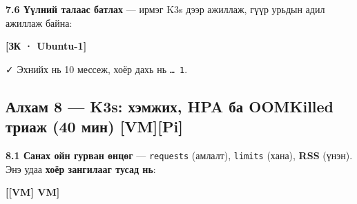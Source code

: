 \textbf{7.6 Үүлний талаас батлах} --- ирмэг K3s дээр ажиллаж, гүүр урьдын адил ажиллаж байна:

\textbf{{[}ЗК · Ubuntu-1{]}}

\begin{Shaded}
\begin{Highlighting}[]
\end{Highlighting}
\end{Shaded}

✓ Эхнийх нь 10 мессеж, хоёр дахь нь \texttt{\ldots{}\ 1}.

\hypertarget{ux430ux43bux445ux430ux43c-8-k3s-ux445ux44dux43cux436ux438ux445-hpa-ux431ux430-oomkilled-ux442ux440ux438ux430ux436-40-ux43cux438ux43d-vmpi}{%
\subsection{Алхам 8 --- K3s: хэмжих, HPA ба OOMKilled триаж (40 мин) {[}VM{]}{[}Pi{]}}\label{ux430ux43bux445ux430ux43c-8-k3s-ux445ux44dux43cux436ux438ux445-hpa-ux431ux430-oomkilled-ux442ux440ux438ux430ux436-40-ux43cux438ux43d-vmpi}}

\textbf{8.1 Санах ойн гурван өнцөг} --- \texttt{requests} (амлалт), \texttt{limits} (хана), \textbf{RSS} (үнэн). Энэ удаа \textbf{хоёр зангилааг тусад нь}:

\textbf{{[}{[}VM{]} VM{]}}

\begin{Shaded}
\begin{Highlighting}[]
\KeywordTok{\&\&} 
\OperatorTok{\textless{}}\OperatorTok{\textgreater{}} \KeywordTok{|} 
\OperatorTok{\textless{}}\OperatorTok{\textgreater{}} \KeywordTok{|} 
\end{Highlighting}
\end{Shaded}

